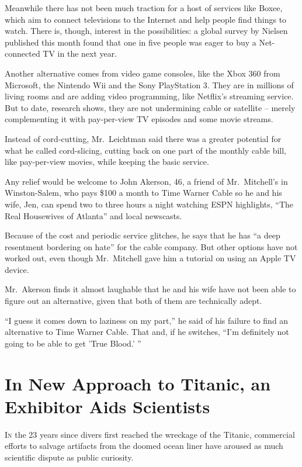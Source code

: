 ﻿\documentclass[12pt]{article}
\begin{document}
Meanwhile there has not been much traction for a host of services like Boxee, which aim to connect
televisions to the Internet and help people find things to watch. There is, though, interest in the
possibilities: a global survey by Nielsen published this month found that one in five people was
eager to buy a Net-connected TV in the next year.

Another alternative comes from video game consoles, like the Xbox 360 from Microsoft, the Nintendo
Wii and the Sony PlayStation 3. They are in millions of living rooms and are adding video
programming, like Netflix's streaming service. But to date, research shows, they are not undermining
cable or satellite -- merely complementing it with pay-per-view TV episodes and some movie streams.

Instead of cord-cutting, Mr.~Leichtman said there was a greater potential for what he called
cord-slicing, cutting back on one part of the monthly cable bill, like pay-per-view movies, while
keeping the basic service.

Any relief would be welcome to John Akerson, 46, a friend of Mr.~Mitchell's in Winston-Salem, who
pays \$100 a month to Time Warner Cable so he and his wife, Jen, can spend two to three hours a
night watching ESPN highlights, ``The Real Housewives of Atlanta'' and local newscasts.

Because of the cost and periodic service glitches, he says that he has ``a deep resentment bordering
on hate'' for the cable company. But other options have not worked out, even though Mr.~Mitchell
gave him a tutorial on using an Apple TV device.

Mr.~Akerson finds it almost laughable that he and his wife have not been able to figure out an
alternative, given that both of them are technically adept.

``I guess it comes down to laziness on my part,'' he said of his failure to find an alternative to
Time Warner Cable. That and, if he switches, ``I'm definitely not going to be able to get 'True
Blood.' ''

\pagebreak
\section{In New Approach to Titanic, an Exhibitor Aids Scientists}

\lettrine{I}{n} the 23 years since divers first reached the wreckage of the
Titanic, commercial efforts to salvage artifacts from the doomed ocean liner have aroused as much
scientific dispute as public curiosity.
\end{document}
